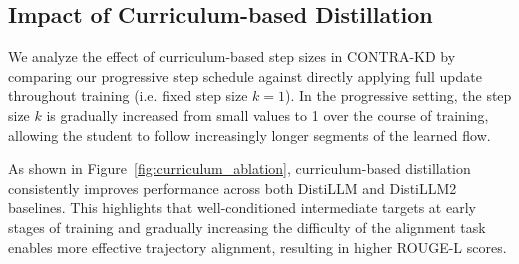 \documentclass{article} %
\theoremstyle{definition}
\theoremstyle{remark}
\begin{document}
\subsection{Impact of Curriculum-based Distillation}
\label{sec:ablation_cl}
\noindent
\begin{minipage}[t]{0.48\textwidth}
\vspace{0pt} %
We analyze the effect of curriculum-based step sizes in CONTRA-KD by comparing our progressive step schedule against directly applying full update throughout training (i.e. fixed step size $k=1$). In the progressive setting, the step size $k$ is gradually increased from small values to 1 over the course of training, allowing the student to follow increasingly longer segments of the learned flow.

As shown in Figure~\ref{fig:curriculum_ablation}, curriculum-based distillation consistently improves performance across both DistiLLM and DistiLLM2 baselines. This highlights that well-conditioned intermediate targets at early stages of training and gradually increasing the difficulty of the alignment task enables more effective trajectory alignment, resulting in higher ROUGE-L scores.
\end{minipage}%
\hfill
\end{document}
